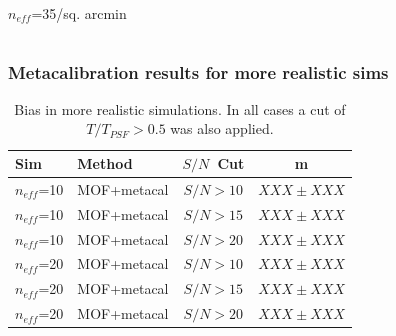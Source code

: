 \documentclass{beamer}
\newcommand{\snr}{$S/N$}
\newcommand{\neff}{$n_{eff}$}
\begin{document}
\begin{frame}
\begin{columns}
\begin{column}{0.5\textwidth}
\begin{center}
                \newline
                \neff=35/sq. arcmin
            \end{center}
        \end{column}
    \end{columns}
\end{frame}

\begin{frame}
    \frametitle{Metacalibration results for more realistic sims}

 
    \begin{table}
        \centering
        \begin{tabular}{|l|l|c|c|}
            \hline
            Sim & Method         & \snr\ Cut & m             \\
            \hline

            \hline
            \neff=10    & MOF+metacal    & \snr$ > 10$ & $XXX \pm XXX$  \\
            \neff=10    & MOF+metacal    & \snr$ > 15$ & $XXX \pm XXX$  \\
            \neff=10    & MOF+metacal    & \snr$ > 20$ & $XXX \pm XXX$  \\
            \hline
            \neff=20    & MOF+metacal    & \snr$ > 10$ & $XXX \pm XXX$  \\
            \neff=20    & MOF+metacal    & \snr$ > 15$ & $XXX \pm XXX$  \\
            \neff=20    & MOF+metacal    & \snr$ > 20$ & $XXX \pm XXX$  \\
            \hline

        \end{tabular}
        \caption{Bias in more realistic simulations.  In all cases a cut
            of $T/T_{PSF} > 0.5$ was also applied.
        \label{tab:mcal:deblending}}
    \end{table}


\end{frame}
\end{document}
